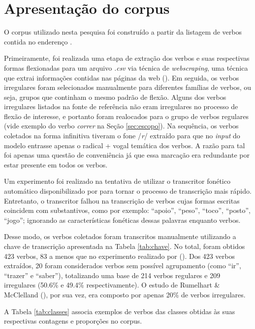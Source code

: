 \section{Apresentação do corpus}
\label{sec:corpus}
O corpus utilizado nesta pesquisa foi construído a partir da listagem de verbos contida no enderenço .

Primeiramente, foi realizada uma etapa de extração dos verbos e suas respectivas formas flexionadas para um arquivo \textit{.csv} via técnica de \textit{webscraping}, uma técnica que extrai informações contidas nas páginas da web (\cite{mitchell:2015}). Em seguida, os verbos irregulares foram selecionados manualmente para diferentes famílias de verbos, ou seja, grupos que continham o mesmo padrão de flexão. Alguns dos verbos irregulares listados na fonte de referência não eram irregulares no processo de flexão de interesse, e portanto foram realocados para o grupo de verbos regulares (vide exemplo do verbo \textit{correr} na Seção \ref{sec:escopo}). Na sequência, os verbos coletados na forma infinitiva tiveram o fone /\textit{r}/ extraído para que no \textit{input} do modelo entrasse apenas o radical + vogal temática dos verbos. A razão para tal foi apenas uma questão de conveniência já que essa marcação era redundante por estar presente em todos os verbos. 

 Um experimento foi realizado na tentativa de utilizar o transcritor fonético automático disponibilizado por \cite{guide:2016} para tornar o processo de transcrição mais rápido. Entretanto, o transcritor falhou na transcrição de verbos cujas formas escritas coincidem com substantivos, como por exemplo: “apoio”, “peso”, “toco”, “posto”, “jogo”; ignorando as características fonéticas dessas palavras enquanto verbos. 
 
 Desse modo, os verbos coletados foram transcritos manualmente utilizando a chave de transcrição apresentada na Tabela \ref{tab:chave}. No total, foram obtidos 423 verbos, 83 a menos que no experimento realizado por (\cite{rumelhart:1986}). Dos 423 verbos extraídos, 20 foram considerados verbos sem possível agrupamento (como “ir”, “trazer” e “saber”), totalizando uma base de 214 verbos regulares e 209 irregulares (50.6\% e 49.4\% respectivamente). O estudo de Rumelhart \& McClelland (\citeyear{rumelhart:1986}), por sua vez, era composto por apenas 20\% de verbos irregulares.

A Tabela \ref{tab:classes} associa exemplos de verbos das classes obtidas às suas respectivas contagens e proporções no corpus.

